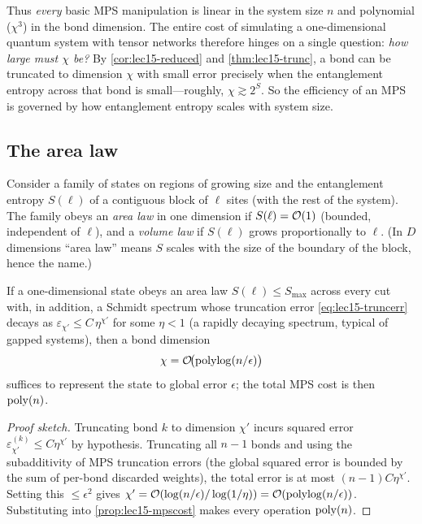 Thus \emph{every} basic MPS manipulation is linear in the system size $n$ and
polynomial ($\chi^{3}$) in the bond dimension. The entire cost of simulating a
one-dimensional quantum system with tensor networks therefore hinges on a single
question: \emph{how large must $\chi$ be?} By \cref{cor:lec15-reduced} and
\cref{thm:lec15-trunc}, a bond can be truncated to dimension $\chi$ with small
error precisely when the entanglement entropy across that bond is small---roughly,
$\chi\gtrsim 2^{S}$. So the efficiency of an MPS is governed by how entanglement
entropy scales with system size.

\subsection{The area law}

\begin{definition}\label{def:lec15-arealaw}
Consider a family of states on regions of growing size and the entanglement
entropy $S(\ell)$ of a contiguous block of $\ell$ sites (with the rest of the
system). The family obeys an \emph{area law} in one dimension if $S(\ell)=\mathcal{O}(1)$
(bounded, independent of $\ell$), and a \emph{volume law} if $S(\ell)$ grows
proportionally to $\ell$. (In $D$ dimensions ``area law'' means $S$ scales with
the size of the boundary of the block, hence the name.)
\end{definition}

\begin{proposition}\label{prop:lec15-eff}
If a one-dimensional state obeys an area law $S(\ell)\le S_{\max}$ across every
cut with, in addition, a Schmidt spectrum whose truncation error
\eqref{eq:lec15-truncerr} decays as $\varepsilon_{\chi'}\le C\,\eta^{\chi'}$ for
some $\eta<1$ (a rapidly decaying spectrum, typical of gapped systems), then a
bond dimension
\[
  \chi=\mathcal{O}\!\bigl(\operatorname{polylog}(n/\epsilon)\bigr)
\]
suffices to represent the state to global error $\epsilon$; the total MPS cost is
then $\operatorname{poly}(n)$.
\end{proposition}

\begin{proof}[Proof sketch]
Truncating bond $k$ to dimension $\chi'$ incurs squared error
$\varepsilon^{(k)}_{\chi'}\le C\eta^{\chi'}$ by hypothesis. Truncating all $n-1$
bonds and using the subadditivity of MPS truncation errors (the global squared
error is bounded by the sum of per-bond discarded weights), the total error is at
most $(n-1)C\eta^{\chi'}$. Setting this $\le\epsilon^{2}$ gives
$\chi'=\mathcal{O}(\log(n/\epsilon)/\log(1/\eta))=\mathcal{O}(\operatorname{polylog}(n/\epsilon))$.
Substituting into \cref{prop:lec15-mpscost} makes every operation $\operatorname{poly}(n)$.
\end{proof}

